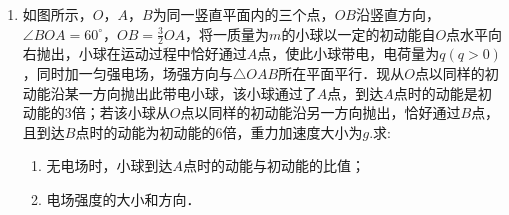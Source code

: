 \begin{enumerate}[leftmargin=0em]
\newpage
\item
{}
如图所示，$ O $，$ A $，$ B $为同一竖直平面内的三个点，$ OB $沿竖直方向，$ \angle BOA = 60 ^{ \circ } $，$ OB = \frac{ 3 }{ 2 } OA $，将一质量为$ m $的小球以一定的初动能自$ O $点水平向右抛出，小球在运动过程中恰好通过$ A $点，使此小球带电，电荷量为$ q(q>0) $，同时加一匀强电场，场强方向与$ \triangle OAB $所在平面平行．现从$ O $点以同样的初动能沿某一方向抛出此带电小球，该小球通过了$ A $点，到达$ A $点时的动能是初动能的$ 3 $倍；若该小球从$ O $点以同样的初动能沿另一方向抛出，恰好通过$ B $点，且到达$ B $点时的动能为初动能的$ 6 $倍，重力加速度大小为$ g $.求:
\begin{enumerate}
\renewcommand{\labelenumi}{\arabic{enumi}.}
\item
无电场时，小球到达$ A $点时的动能与初动能的比值；
\item 
电场强度的大小和方向．



\end{enumerate}
\begin{figure}[h!]
\flushright

\end{figure}





\end{enumerate}
